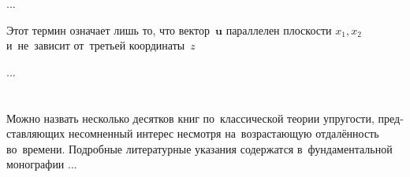 \begin{otherlanguage}{russian}
...





\label{para:planedeformation.linearclassicalelasticity}

Этот термин означает лишь то, что вектор~$\bm{u}$ параллелен плоскости ${x_1, x_2}$ и~не~зависит от~третьей координаты~$z$

...




\vspace{8mm}
\hfill\begin{minipage}[b]{0.95\linewidth}
\fontsize{10}{12}\selectfont

\section*{\wordforbibliography}

Можно назвать несколько десятков книг по~классической теории упругости, представляющих несомненный интерес несмотря на~возрастающую отдалённость во~времени. Подробные литературные указания содержатся в~фундаментальной монографии ...

\end{minipage}

\end{otherlanguage}
